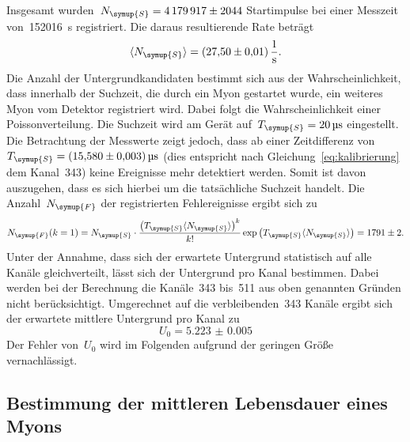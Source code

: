 Insgesamt wurden~$N_{\symup{S}}=\num{4179917(2044)}$ Startimpulse bei einer
Messzeit von~\SI{152016}{\second} registriert. Die daraus resultierende Rate
beträgt
%
\begin{equation}
  \langle N_{\symup{S}}\rangle=\SI{27.50(1)}{\per\second}.
  \label{eq:rate_start}
\end{equation}
%
Die Anzahl der Untergrundkandidaten bestimmt sich aus der Wahrscheinlichkeit,
dass innerhalb der Suchzeit, die durch ein Myon gestartet wurde, ein weiteres
Myon vom Detektor registriert wird. Dabei folgt die Wahrscheinlichkeit einer
Poissonverteilung. Die Suchzeit wird am Gerät
auf~$T_{\symup{S}}=\SI{20}{\micro\second}$ eingestellt. Die Betrachtung der
Messwerte zeigt jedoch, dass ab einer Zeitdifferenz
von~$T_{\symup{S}}=\SI{15.580(3)}{\micro\second}$ (dies entspricht nach
Gleichung~\eqref{eq:kalibrierung} dem Kanal~\num{343}) keine Ereignisse mehr
detektiert werden. Somit ist davon auszugehen, dass es sich hierbei um die
tatsächliche Suchzeit handelt. Die Anzahl~$N_{\symup{F}}$ der registrierten
Fehlereignisse ergibt sich zu
%
\begin{equation}
  N_{\symup{F}}(k=1)=N_{\symup{S}}\cdot\frac{\left(T_{\symup{S}}\langle N_{\symup{S}}\rangle\right)^k}{k!}\exp\left(T_{\symup{S}}\langle N_{\symup{S}}\rangle\right)=\num{1791(2)}.
  \label{eq:untergrund_gesamt}
\end{equation}
%
Unter der Annahme, dass sich der erwartete Untergrund statistisch auf alle
Kanäle gleichverteilt, lässt sich der Untergrund pro Kanal bestimmen. Dabei
werden bei der Berechnung die Kanäle~\num{343} bis~\num{511} aus oben genannten
Gründen nicht berücksichtigt. Umgerechnet auf die verbleibenden~\num{343} Kanäle
ergibt sich der erwartete mittlere Untergrund pro Kanal zu
%
\begin{equation}
  U_0=\num{5.223(5)}
  \label{eq:untergrund_kanal}
\end{equation}
%
Der Fehler von~$U_0$ wird im Folgenden aufgrund der geringen Größe
vernachlässigt.

\subsection{Bestimmung der mittleren Lebensdauer eines Myons}

